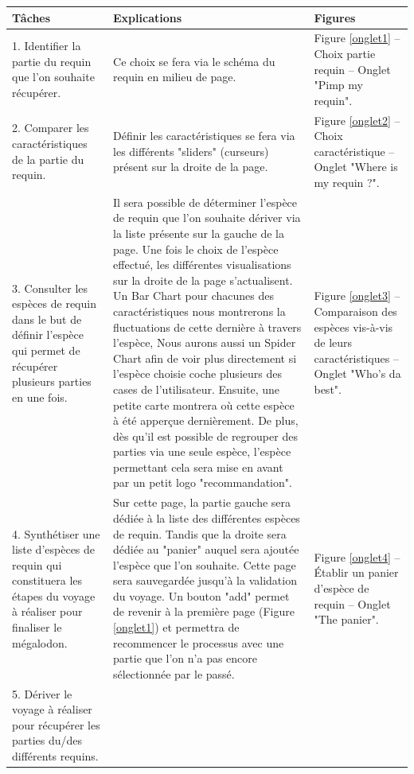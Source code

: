 \documentclass{article}
\begin{document}
\begin{center}
	\begin{tabular}{|p{3.5cm}|p{7cm}|p{3.5cm}|}
		\hline
		Tâches
		 &
		Explications
		 &
		Figures
		\\\hline
		1. Identifier la partie du requin que l’on souhaite récupérer.
		 &
		Ce choix se fera via le schéma du requin en milieu de page.
		 &

		Figure \ref{onglet1} – Choix partie requin – Onglet "Pimp my requin".
		\\\hline
		2. Comparer les caractéristiques de la partie du requin.
		 &
		Définir les caractéristiques se fera via les différents "sliders" (curseurs) présent sur la droite de la page.
		 &
		Figure \ref{onglet2} – Choix caractéristique – Onglet "Where is my requin ?".
		\\\hline
		3. Consulter les espèces de requin dans le but de définir l’espèce qui permet de récupérer plusieurs parties en une fois.
		 &
		Il sera possible de déterminer l’espèce de requin que l’on souhaite dériver via la liste présente sur la gauche de la page. Une fois le choix de l’espèce effectué, les différentes visualisations sur la droite de la page s'actualisent. Un Bar Chart pour chacunes des caractéristiques nous montrerons la fluctuations de cette dernière à travers l'espèce, Nous aurons aussi un Spider Chart afin de voir plus directement si l'espèce choisie coche plusieurs des cases de l'utilisateur. Ensuite, une petite carte montrera où cette espèce à été apperçue dernièrement. De plus, dès qu'il est possible de regrouper des parties via une seule espèce, l'espèce permettant cela sera mise en avant par un petit logo "recommandation".
		 &
		Figure \ref{onglet3} – Comparaison des espèces vis-à-vis de leurs caractéristiques – Onglet "Who's da best".
		\\\hline
		4. Synthétiser une liste d’espèces de requin qui constituera les étapes du voyage à réaliser pour finaliser le mégalodon.
		 &
		Sur cette page, la partie gauche sera dédiée à la liste des différentes espèces de requin. Tandis que la droite sera dédiée au "panier" auquel sera ajoutée l’espèce que l’on souhaite. Cette page sera sauvegardée jusqu’à la validation du voyage. Un bouton "add" permet de revenir à la première page (Figure \ref{onglet1}) et permettra de recommencer le processus avec une partie que l’on n'a pas encore sélectionnée par le passé.
		 &
		Figure \ref{onglet4} – Établir un panier d’espèce de requin – Onglet "The panier".
		\\\hline
		5. Dériver le voyage à réaliser pour récupérer les parties du/des différents requins.

\end{tabular}
\end{center}
\end{document}
